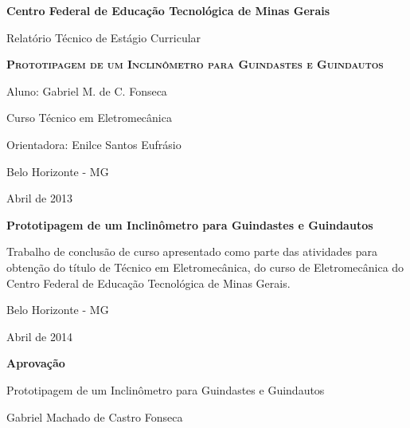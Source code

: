 \documentclass[a4paper,12pt]{article}
\begin{document}
\lstset{language=C,numbers=left,numberstyle=\tiny,stepnumber=2,basicstyle=\small,showstringspaces=false}
\begin{titlepage}
\begin{center}
{\large\bf Centro Federal de Educação Tecnológica de Minas Gerais}

{\large Relatório Técnico de Estágio Curricular}

\vfill

\textsc{\LARGE\bf Prototipagem de um Inclinômetro para Guindastes e Guindautos}
\end{center}

\begin{flushright}
\medskip
{\large Aluno: Gabriel M. de C. Fonseca}

{\large Curso Técnico em Eletromecânica}

{\large Orientadora: Enilce Santos Eufrásio}
\end{flushright}

\begin{center}
\vfill

Belo Horizonte - MG

Abril de 2013
\end{center}
\end{titlepage}

\newpage
\thispagestyle{empty}

\begin{center}
\Large\bf Prototipagem de um Inclinômetro para Guindastes e Guindautos
\end{center}

\vfill

\begin{flushright}
\begin{minipage}{.45\textwidth}
Trabalho de conclusão de curso apresentado como parte das atividades para obtenção do título de Técnico em Eletromecânica, do curso de Eletromecânica do Centro Federal de Educação Tecnológica de Minas Gerais.
\end{minipage}
\end{flushright}

\vfill

\begin{center}
Belo Horizonte - MG

Abril de 2014
\end{center}

\newpage
\thispagestyle{empty}

\begin{center}
{\Large\bf Aprovação}

\vspace{.8cm}
{\large Prototipagem de um Inclinômetro para Guindastes e Guindautos}

\vspace{1.2cm}
Gabriel Machado de Castro Fonseca
\end{center}
\end{document}
